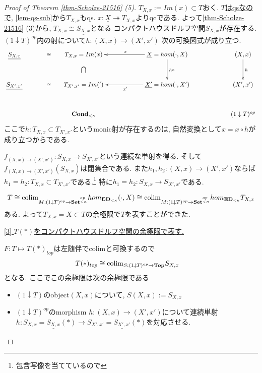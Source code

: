 \documentclass[dvipdfmx,a4paper,11pt]{article}
\newcommand{\colim}{{\rm colim}}
\theoremstyle{definition}
\begin{document}
\begin{proof}[Proof of Theorem \ref{thm-Scholze-21516} (5)]
$T_{X,x}:= Im(x) \subset T$おく. 
\underline{$T$はqsなので}, \ref{lem-qs-sub}から$T_{X,x}$もqs. $x : \underline{X} \twoheadrightarrow T_{X,x}$よりqcである. 
よって\ref{thm-Scholze-21516} (3)から, $T_{X, x} \cong \underline{S_{X,x}}$となる
コンパクトハウスドルフ空間$S_{X,x}$が存在する. 
$( 1\downarrow T)^{op}$内の射について$h : (X,x) \to (X', x')$ 次の可換図式が成り立つ.
\begin{equation*}
\xymatrix@C=60pt@R=30pt{
\underline{S_{X,x}}\ar@{}[r]|{\cong} 
&T_{X, x} = Im(x) \ar@{}[d]|{\bigcap}
&\underline{X} = hom (\cdot, X)\ar@{->}[l]_{x} \ar@{->}[d]^{h \circ }
& (X, x)  \ar@{->}[d]^{h}
\\
\underline{S_{X',x'}}\ar@{}[r]|{\cong} 
&T_{X', x'}= Im(')
&\underline{X'} = hom (\cdot, X')\ar@{->}[l]^{x'}
& (X' , x')
 \\   
&{\bf Cond}_{< \kappa}
& 
& ( 1\downarrow T)^{op}
 \\   
}
\end{equation*}
ここで$h : T_{X, x} \subset T_{X', x'}$というmonic射が存在するのは, 
自然変換として$x = x \circ h$が成り立つからである.

$f_{(X,x) \to (X' , x')}:  S_{X,x} \to S_{X', x'}$という連続な単射を得る. 
そして$f_{(X,x) \to (X' , x')}(S_{X,x})$は閉集合である. 
また$h_1,h_2 : (X,x) \to (X', x')$ならば$h_1 = h_2 : T_{X, x} \subset T_{X', x'}$である.\footnote{包含写像を当てているので} 特に$h_1 = h_2: S_{X,x} \to S_{X', x'}$である. 


$$
T \cong  
\colim_{M : ( 1\downarrow T)^{op}\to  {\bf Set }^{{\bf }_{<\kappa}^{op}}}
hom_{ {\bf ED}_{<\kappa}}(\cdot, X)
\cong 
\colim_{M : ( 1\downarrow T)^{op}\to  {\bf Set }^{{\bf }_{<\kappa}^{op}}}
hom_{ {\bf ED}_{<\kappa}}T_{X,x}
$$
ある.
よって$T_{X,x}= \underline{X} \subset T$の余極限で$T$を表すことができた. 

\underline{[3] $T(\ast)$をコンパクトハウスドルフ空間の余極限で表す.}

$F : T \mapsto T(\ast)_{top}$は左随伴でcolimと可換するので
\begin{align*}
\begin{split}
T(\ast)_{top}
&\cong 
\colim_{S : ( 1\downarrow T)^{op} \to {\bf Top}}S_{X,x}
\end{split}
\end{align*}
となる.
 ここでこの余極限は次の余極限である
 \begin{itemize}
 \item $( 1\downarrow T)$のobject$(X,x)$について, $S(X,x) := S_{X,x}$
 \item $( 1\downarrow T)^{op}$のmorphism $h : (X,x) \to (X',x') $について連続単射
 $h : S_{X,x}=\underline{S_{X,x}}(\ast) \to S_{X',x'}=\underline{S_{X',x'}}(\ast)$を対応させる. 
 \end{itemize}
 

\end{proof}
\end{document}
